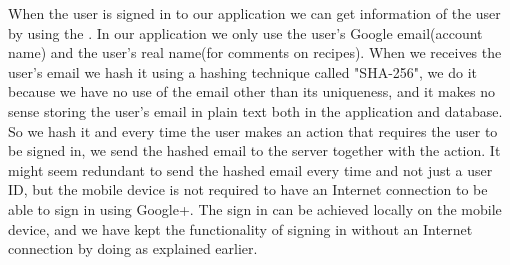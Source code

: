 When the user is signed in to our application we can get information of the user by using the .
In our application we only use the user's Google email(account name) and the user's real name(for comments on recipes). 
When we receives the user's email we hash it using a hashing technique called "SHA-256", we do it because we have no use of the email other than its uniqueness, and it makes no sense storing the user's email in plain text both in the application and database. 
So we hash it and every time the user makes an action that requires the user to be signed in, we send the hashed email to the server together with the action. 
It might seem redundant to send the hashed email every time and not just a user ID, but the mobile device is not required to have an Internet connection to be able to sign in using Google+. 
The sign in can be achieved locally on the mobile device, and we have kept the functionality of signing in without an Internet connection by doing as explained earlier.



